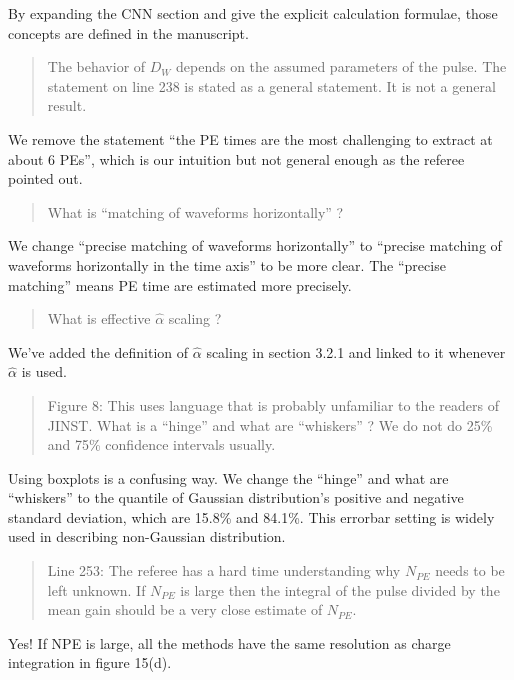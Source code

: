 \documentclass[12pt]{article}
\begin{document}
By expanding the CNN section and give the explicit calculation formulae, those concepts are defined in the manuscript.

\begin{quote}
    The behavior of $D_W$ depends on the assumed parameters of the pulse. The statement on line 238 is stated as a general statement. It is not a general result. 
\end{quote}

We remove the statement ``the PE times are the most challenging to extract at about 6 PEs'', which is our intuition but not general enough as the referee pointed out.

\begin{quote}
    What is ``matching of waveforms horizontally'' ?
\end{quote}
We change ``precise matching of waveforms horizontally'' to ``precise matching of waveforms horizontally in the time axis'' to be more clear. The ``precise matching'' means PE time are estimated more precisely. 

\begin{quote}
    What is effective $\hat{\alpha}$ scaling ?
\end{quote}

We've added the definition of $\hat{\alpha}$ scaling in section 3.2.1 and linked to it  whenever $\hat{\alpha}$ is used.

\begin{quote}
Figure 8: This uses language that is probably unfamiliar to the readers of JINST. What is a ``hinge'' and what are ``whiskers'' ? We do not do 25\% and 75\% confidence intervals usually.
\end{quote}

Using boxplots is a confusing way. We change the ``hinge'' and what are ``whiskers'' to the quantile of Gaussian distribution's positive and negative standard deviation, which are 15.8\% and 84.1\%. This errorbar setting is widely used in describing non-Gaussian distribution.

\begin{quote}
Line 253: The referee has a hard time understanding why $N_{PE}$ needs to be left unknown. If $N_{PE}$ is large then the integral of the pulse divided by the mean gain should be a very close estimate of $N_{PE}$. 
\end{quote}

Yes! If NPE is large, all the methods have the same resolution as charge integration in figure 15(d).
\end{document}
